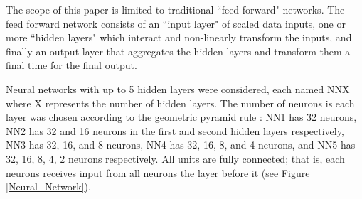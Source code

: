 \documentclass[a4paper]{article}
\begin{document}
	The scope of this paper is limited to traditional ``feed-forward" networks. The feed forward network consists of an ``input layer" of scaled data inputs, one or more ``hidden layers" which interact and non-linearly transform the inputs, and finally an output layer that aggregates the hidden layers and transform them a final time for the final output. 
	
	Neural networks with up to 5 hidden layers were considered, each named NNX where X represents the number of hidden layers. The number of neurons is each layer was chosen according to the geometric pyramid rule \citep{masters_practical_1993}: NN1 has 32 neurons, NN2 has 32 and 16 neurons in the first and second hidden layers respectively, NN3 has 32, 16, and 8 neurons, NN4 has 32, 16, 8, and 4 neurons, and NN5 has 32, 16, 8, 4, 2 neurons respectively. All units are fully connected; that is, each neurons receives input from all neurons the layer before it (see Figure \ref{Neural_Network}).
	
\end{document}

